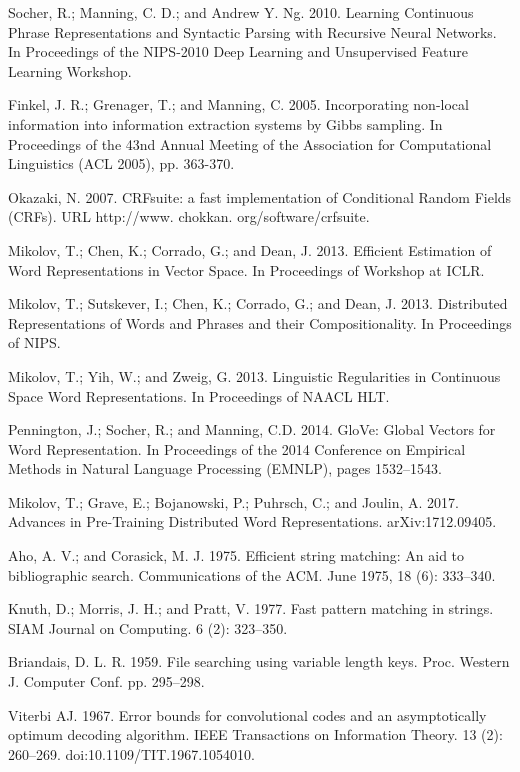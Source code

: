 \documentclass[letterpaper]{article} %
\begin{document}
\smallskip \noindent
Socher, R.; Manning, C. D.; and Andrew Y. Ng. 2010. Learning Continuous Phrase Representations and Syntactic Parsing with Recursive Neural Networks. In Proceedings of the NIPS-2010 Deep Learning and Unsupervised Feature Learning Workshop. 

\smallskip \noindent
Finkel, J. R.; Grenager, T.; and Manning, C. 2005. Incorporating non-local information into information extraction systems by Gibbs sampling. In Proceedings of the 43nd Annual Meeting of the Association for Computational Linguistics (ACL 2005), pp. 363-370. 

\smallskip \noindent
Okazaki, N. 2007. CRFsuite: a fast implementation of Conditional Random Fields (CRFs). URL http://www. chokkan. org/software/crfsuite. 

\smallskip \noindent
Mikolov, T.; Chen, K.; Corrado, G.; and Dean, J. 2013. Efficient Estimation of Word Representations in Vector Space. In Proceedings of Workshop at ICLR. 

\smallskip \noindent
Mikolov, T.; Sutskever, I.; Chen, K.; Corrado, G.; and Dean, J. 2013. Distributed Representations of Words and Phrases and their Compositionality. In Proceedings of NIPS. 

\smallskip \noindent
Mikolov, T.; Yih, W.; and Zweig, G. 2013. Linguistic Regularities in Continuous Space Word Representations. In Proceedings of NAACL HLT. 

\smallskip \noindent
Pennington, J.; Socher, R.; and Manning, C.D. 2014. GloVe: Global Vectors for Word Representation. In Proceedings of the 2014 Conference on Empirical Methods in Natural Language Processing (EMNLP), pages 1532–1543. 

\smallskip \noindent
Mikolov, T.; Grave, E.; Bojanowski, P.; Puhrsch, C.; and Joulin, A. 2017. Advances in Pre-Training Distributed Word Representations. arXiv:1712.09405. 

\smallskip \noindent
Aho, A. V.; and Corasick, M. J. 1975. Efficient string matching: An aid to bibliographic search. Communications of the ACM. June 1975, 18 (6): 333–340.

\smallskip \noindent
Knuth, D.; Morris, J. H.; and Pratt, V. 1977. Fast pattern matching in strings. SIAM Journal on Computing. 6 (2): 323–350. 

\smallskip \noindent
Briandais, D. L. R. 1959. File searching using variable length keys. Proc. Western J. Computer Conf. pp. 295–298. 

\smallskip \noindent
Viterbi AJ. 1967. Error bounds for convolutional codes and an asymptotically optimum decoding algorithm. IEEE Transactions on Information Theory. 13 (2): 260–269. doi:10.1109/TIT.1967.1054010. 
\end{document}
